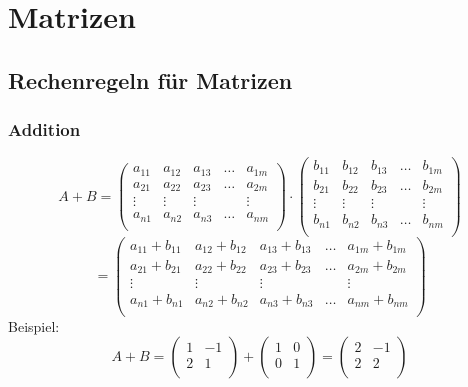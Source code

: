 \section{Matrizen}
\subsection{Rechenregeln für Matrizen}
\subsubsection{Addition}
\[ A + B =
  \begin {pmatrix}
    a_{11} & a_{12} & a_{13} & \hdots & a_{1m} \\
    a_{21} & a_{22} & a_{23} & \hdots & a_{2m} \\
    \vdots  & \vdots  & \vdots  &        & \vdots  \\
    a_{n1} & a_{n2} & a_{n3} & \hdots & a_{nm} \\
  \end {pmatrix} \cdot 
  \begin {pmatrix}
    b_{11} & b_{12} & b_{13} & \hdots & b_{1m} \\
    b_{21} & b_{22} & b_{23} & \hdots & b_{2m} \\
    \vdots  & \vdots  & \vdots  &        & \vdots  \\
    b_{n1} & b_{n2} & b_{n3} & \hdots & b_{nm} \\
  \end {pmatrix} \]
\[ = \begin {pmatrix}
    a_{11} + b_{11} & a_{12} + b_{12} & a_{13} + b_{13} & \hdots &
      a_{1m} + b_{1m} \\
    a_{21} + b_{21} & a_{22} + b_{22} & a_{23} + b_{23} & \hdots &
      a_{2m} + b_{2m} \\
    \vdots  & \vdots  & \vdots  &        & \vdots  \\
    a_{n1} + b_{n1} & a_{n2} + b_{n2} & a_{n3} + b_{n3} & \hdots &
    a_{nm} + b_{nm} \\
  \end {pmatrix} \]
Beispiel:
\[ A + B =
  \begin {pmatrix} 1 & -1 \\ 2 & 1 \\ \end {pmatrix} +
  \begin {pmatrix} 1 & 0 \\ 0 & 1 \\ \end {pmatrix} =
  \begin {pmatrix} 2 & -1 \\ 2 & 2 \\ \end {pmatrix} 
\]

